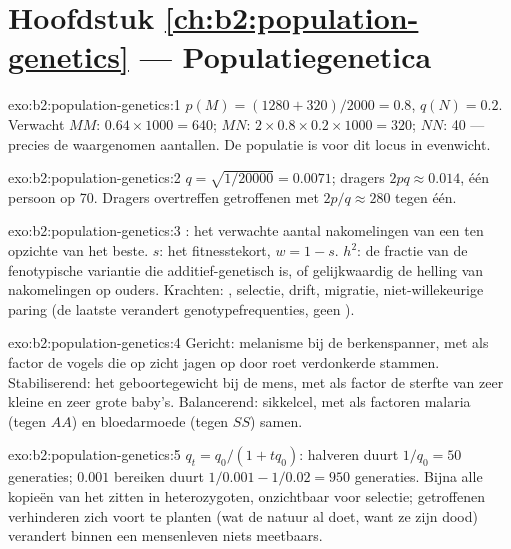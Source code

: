 \section*{Hoofdstuk \ref{ch:b2:population-genetics} --- Populatiegenetica}

\begin{solution}{exo:b2:population-genetics:1}
$p(M) = (1280 + 320)/2000 = 0.8$, $q(N) = 0.2$. Verwacht $MM$:
$0.64\times 1000 = 640$; $MN$: $2\times 0.8\times 0.2\times 1000 =
320$; $NN$: 40 --- precies de waargenomen aantallen. De populatie is
voor dit locus in evenwicht.
\end{solution}

\begin{solution}{exo:b2:population-genetics:2}
$q = \sqrt{1/20000} = 0.0071$; dragers $2pq \approx 0.014$, één
persoon op 70. Dragers overtreffen getroffenen met $2p/q \approx
280$ tegen één.
\end{solution}

\begin{solution}{exo:b2:population-genetics:3}
: het verwachte aantal nakomelingen van een  ten opzichte van
het beste.  $s$: het fitnesstekort, $w = 1 -
s$.  $h^{2}$: de fractie van de fenotypische variantie
die additief-genetisch is, of gelijkwaardig de helling van nakomelingen op
ouders. Krachten: , selectie, drift, migratie, niet-willekeurige
paring (de laatste verandert genotypefrequenties, geen ).
\end{solution}

\begin{solution}{exo:b2:population-genetics:4}
Gericht: melanisme bij de berkenspanner, met als factor de vogels die op zicht
jagen op door roet verdonkerde stammen. Stabiliserend: het geboortegewicht
bij de mens, met als factor de sterfte van zeer kleine en zeer grote baby's.
Balancerend: sikkelcel, met als factoren malaria (tegen $AA$) en bloedarmoede
(tegen $SS$) samen.
\end{solution}

\begin{solution}{exo:b2:population-genetics:5}
$q_t = q_0/(1 + tq_0)$: halveren duurt $1/q_0 = 50$ generaties;
$0.001$ bereiken duurt $1/0.001 - 1/0.02 = 950$ generaties. Bijna
alle kopieën van het  zitten in heterozygoten, onzichtbaar voor
selectie; getroffenen verhinderen zich voort te planten (wat de natuur
al doet, want ze zijn dood) verandert binnen een mensenleven niets
meetbaars.
\end{solution}

